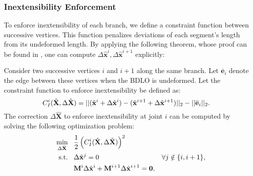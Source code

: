 \subsubsection{Inextensibility Enforcement}
To enforce inextensibility of each branch, we define a constraint function between successive vertices. 
This function penalizes deviations of each segment’s length from its undeformed length.
By applying the following theorem, whose proof can be found in  \cite[Appendix B.2]{DEFORM}, one can compute $\Delta \hat{\mathbf{x}}^i, \Delta \hat{\mathbf{x}}^{i+1}$ explicitly:
\begin{thm}
    \label{theorem:inextensibility}
    Consider two successive vertices \(i\) and \(i+1\) along the same branch. 
    Let \(\overline{\mathbf{e}}_i\) denote the edge between these vertices when the BDLO is undeformed. 
    Let the constraint function to enforce inextensibility be defined as:
    \begin{equation}
   \hspace*{-0.1cm} C^i_{I}(\hat{\mathbf{X}},\Delta \hat{\mathbf{X}} ) = 
    ||(\hat{\mathbf{x}}^i+\Delta \hat{\mathbf{x}}^i) - (\hat{\mathbf{x}}^{i+1}+\Delta \hat{\mathbf{x}}^{i+1})||_2 -  ||\overline{\textbf{e}}_i||_2.
    \label{eq:constraint_inextensibility}
    \end{equation}
    The correction $\Delta \hat{\mathbf{X}}$ to enforce inextensibility at joint $i$ can be computed by solving the following optimization problem:
    \begin{align}
    &&\underset{\Delta \hat{\mathbf{X}}}{\min} & \hspace{0.3cm} \frac{1}{2}\left(C^i_{I}(\hat{\mathbf{X}},\Delta \hat{\mathbf{X}} ) \right)^2   & \label{eq:cost} \\
    &&\text{s.t.} &\hspace{0.3cm}  \Delta \hat{\mathbf{x}}^j = 0 &  \forall j \notin \{i,i+1\}, \notag  \\
    && & \hspace{0.3cm}  \mathbf{M}^i  \Delta \hat{\mathbf{x}}^i + \mathbf{M}^{i+1}  \Delta \hat{\mathbf{x}}^{i+1}= \mathbf{0}, &  \notag \\
    && &\hspace{0.3cm} 

\end{align}
\end{thm}
